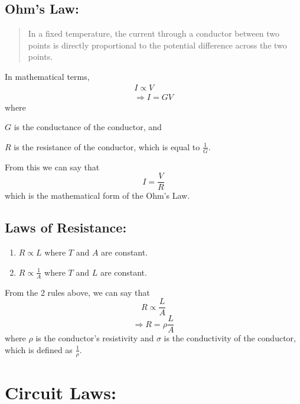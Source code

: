 \documentclass[a4paper]{report}
\begin{document}
        \subsection{Ohm's Law:}
            \begin{quotation}
                In a fixed temperature, the current through a conductor between two points is directly proportional to the potential difference across the two points.
            \end{quotation}
            In mathematical terms,
            \begin{align*}
                I \propto V \\
                \Rightarrow I = GV 
            \end{align*}
            where
            \begin{description}
                \item $G$ is the conductance of the conductor, and
                \item $R$ is the resistance of the conductor, which is equal to $\frac{1}{G}$. 
            \end{description}
            From this we can say that
            \begin{equation}
                I = \frac{V}{R}
            \end{equation}
            which is the mathematical form of the Ohm's Law.
        \subsection{Laws of Resistance:}
            \begin{enumerate}
                \item $R \propto L$ where $T$ and $A$ are constant.
                \item $R \propto \frac{1}{A}$ where $T$ and $L$ are constant.
            \end{enumerate}
            From the 2 rules above, we can say that
            \begin{equation*}
                R \propto \frac{L}{A}
            \end{equation*}
            \begin{equation}
                \Rightarrow R = \rho \frac{L}{A}
            \end{equation}
            where $\rho$ is the conductor's resistivity and $\sigma$ is the conductivity of the conductor, which is defined as $\frac{1}{\rho}$.
    \section{Circuit Laws:}
\end{document}

